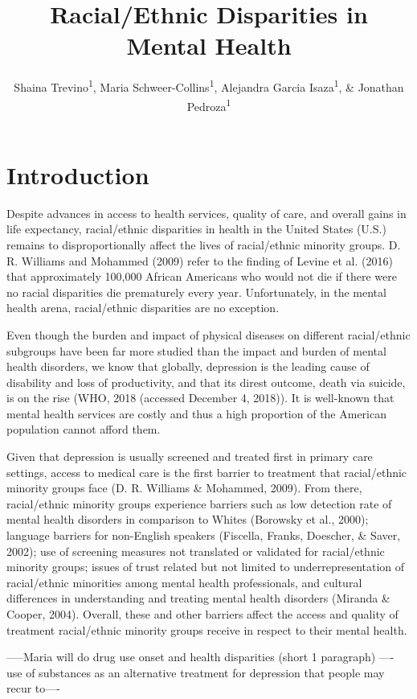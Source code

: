 \documentclass[man]{apa6}
\title{Racial/Ethnic Disparities in Mental Health}
\author{Shaina Trevino\textsuperscript{1}, Maria
Schweer-Collins\textsuperscript{1}, Alejandra Garcia
Isaza\textsuperscript{1}, \& Jonathan Pedroza\textsuperscript{1}}
\date{}
\affiliation{
\vspace{0.5cm}
\textsuperscript{1} University of Oregon}
\begin{document}
\maketitle

\section{Introduction}\label{introduction}

Despite advances in access to health services, quality of care, and
overall gains in life expectancy, racial/ethnic disparities in health in
the United States (U.S.) remains to disproportionally affect the lives
of racial/ethnic minority groups. D. R. Williams and Mohammed (2009)
refer to the finding of Levine et al. (2016) that approximately 100,000
African Americans who would not die if there were no racial disparities
die prematurely every year. Unfortunately, in the mental health arena,
racial/ethnic disparities are no exception.

Even though the burden and impact of physical diseases on different
racial/ethnic subgroups have been far more studied than the impact and
burden of mental health disorders, we know that globally, depression is
the leading cause of disability and loss of productivity, and that its
direst outcome, death via suicide, is on the rise (WHO, 2018 (accessed
December 4, 2018)). It is well-known that mental health services are
costly and thus a high proportion of the American population cannot
afford them.

Given that depression is usually screened and treated first in primary
care settings, access to medical care is the first barrier to treatment
that racial/ethnic minority groups face (D. R. Williams \& Mohammed,
2009). From there, racial/ethnic minority groups experience barriers
such as low detection rate of mental health disorders in comparison to
Whites (Borowsky et al., 2000); language barriers for non-English
speakers (Fiscella, Franks, Doescher, \& Saver, 2002); use of screening
measures not translated or validated for racial/ethnic minority groups;
issues of trust related but not limited to underrepresentation of
racial/ethnic minorities among mental health professionals, and cultural
differences in understanding and treating mental health disorders
(Miranda \& Cooper, 2004). Overall, these and other barriers affect the
access and quality of treatment racial/ethnic minority groups receive in
respect to their mental health.

-----Maria will do drug use onset and health disparities (short 1
paragraph) ---- use of substances as an alternative treatment for
depression that people may recur to----
\end{document}

